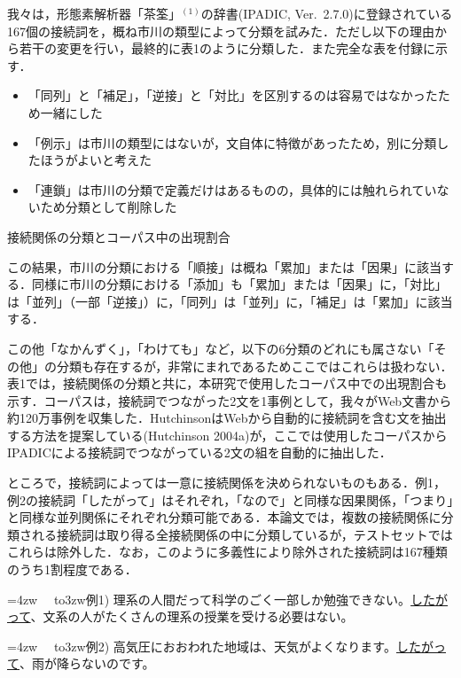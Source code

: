 \documentclass[japanese]{jnlp_1.4}
\begin{document}
我々は，形態素解析器「茶筌」$^{(1)}$の辞書(IPADIC, Ver.~2.7.0)に登録されている167個の接続詞を，概ね市川の類型によって分類を試みた．ただし以下の理由から若干の変更を行い，最終的に表1のように分類した．また完全な表を付録に示す．

\begin{itemize}
\item
「同列」と「補足」，「逆接」と「対比」を区別するのは容易ではなかったため一緒にした

\item
「例示」は市川の類型にはないが，文自体に特徴があったため，別に分類したほうがよいと考えた

\item
「連鎖」は市川の分類で定義だけはあるものの，具体的には触れられていないため分類として削除した
\end{itemize}

\begin{table}[b]
\caption{接続関係の分類とコーパス中の出現割合}

\end{table}

この結果，市川の分類における「順接」は概ね「累加」または「因果」に該当する．同様に市川の分類における「添加」も「累加」または「因果」に，「対比」は「並列」（一部「逆接」）に，「同列」は「並列」に，「補足」は「累加」に該当する．

この他「なかんずく」，「わけても」など，以下の6分類のどれにも属さない「その他」の分類も存在するが，非常にまれであるためここではこれらは扱わない．表1では，接続関係の分類と共に，本研究で使用したコーパス中での出現割合も示す．コーパスは，接続詞でつながった2文を1事例として，我々がWeb文書から約120万事例を収集した．HutchinsonはWebから自動的に接続詞を含む文を抽出する方法を提案している(Hutchinson 2004a)が，ここでは使用したコーパスからIPADICによる接続詞でつながっている2文の組を自動的に抽出した．

ところで，接続詞によっては一意に接続関係を決められないものもある．例1，例2の接続詞「したがって」はそれぞれ，「なので」と同様な因果関係，「つまり」と同様な並列関係にそれぞれ分類可能である．本論文では，複数の接続関係に分類される接続詞は取り得る全接続関係の中に分類しているが，テストセットではこれらは除外した．なお，このように多義性により除外された接続詞は167種類のうち1割程度である．

\hangindent=4zw
\noindent　\hbox to3zw{例1)\hfill}
理系の人間だって科学のごく一部しか勉強できない。\ul{したがって}、文系の人がたくさんの理系の授業を受ける必要はない。

\hangindent=4zw
\noindent　\hbox to3zw{例2)\hfill}
高気圧におおわれた地域は、天気がよくなります。\ul{したがって}、雨が降らないのです。
\end{document}
